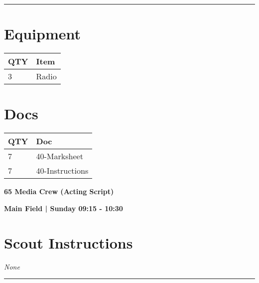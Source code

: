 \documentclass[10pt]{article}
\newcommand{\newtitle}[1]{\begin{center}{\Huge\bfseries #1 }\\ \vspace{5mm}\end{center}}
\newcommand{\newsubtitle}[1]{\begin{center}{\color{grey}\Large\bfseries #1 }\\ \vspace{5mm}\end{center}}
\begin{document}
			\vspace{0.5cm}
	\hrule
	\vspace{0.5cm}

	\begin{multicols}{2}

		\section*{\faWrench \: Equipment}

		
	\begin{center}
			\begin{tabular}{p{2cm}p{4cm}}


				\textbf{QTY} & \textbf{Item} \\\toprule
												3&Radio\\\midrule
								\end{tabular}

			\end{center}

		
		\vfill\null
		\columnbreak

			\section*{\faFile \: Docs}
		 	\begin{center}
			\begin{tabular}{p{2cm}p{4cm}}

			\textbf{QTY} & \textbf{Doc} \\\toprule
										7&40-Marksheet\\\midrule
										7&40-Instructions\\\midrule
							\end{tabular}
			\end{center}
	

		\vfill\null

		\end{multicols}



	\vspace{1cm}


	\clearpage
		\newtitle{65 Media Crew (Acting Script) }
	\newsubtitle{Main Field | Sunday 09:15 - 10:30}
		\setcounter{section}{64}
	\section*{Scout Instructions}
		\textit{None}
	
	\vspace{0.5cm}
	\hrule
	\vspace{0.5cm}
\end{document}
